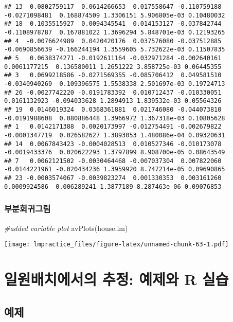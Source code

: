 \documentclass[
]{book}
\newenvironment{Shaded}{\begin{snugshade}}{\end{snugshade}}
\newcommand{\CommentTok}[1]{\textcolor[rgb]{0.56,0.35,0.01}{\textit{#1}}}
\newcommand{\FunctionTok}[1]{\textcolor[rgb]{0.00,0.00,0.00}{#1}}
\newcommand{\NormalTok}[1]{#1}
\begin{document}
\begin{verbatim}
## 13  0.0802759117  0.0614266653  0.017558647 -0.110759188 -0.0271098481  0.168874509 1.3306151 5.906805e-03 0.10480032
## 18  0.1035515927  0.0094345541  0.014153127 -0.037842744 -0.1108978787  0.167881022 1.3696294 5.848701e-03 0.12193265
## 4  -0.0076624989  0.0420420176  0.037576080 -0.037512885 -0.0690856639 -0.166244194 1.3559605 5.732622e-03 0.11507835
## 5   0.0638374271 -0.0192611164 -0.032971284 -0.002640161  0.0061177215  0.136580011 1.2651222 3.858725e-03 0.06445355
## 3   0.0699218586 -0.0271569355 -0.085706412  0.049581510 -0.0340940269  0.109396575 1.5538338 2.501697e-03 0.19724713
## 26 -0.0027742220 -0.0191783392  0.010712437 -0.010330051  0.0161132923 -0.094033628 1.2894913 1.839532e-03 0.05564326
## 19  0.0146019324  0.0368361881  0.021746080 -0.044073810 -0.0191988608  0.080886448 1.3966972 1.367318e-03 0.10805628
## 1   0.0142171388  0.0020173997 -0.012754491 -0.002679822 -0.0001347719  0.026582627 1.3893053 1.480086e-04 0.09320631
## 14  0.0067843423 -0.0004028513  0.010527346 -0.010173078 -0.0019433376  0.020622293 1.3797899 8.908700e-05 0.08643549
## 7   0.0062121502 -0.0030464468 -0.007037304  0.007822060 -0.0144221961 -0.020434236 1.3959920 8.747214e-05 0.09690865
## 23 -0.0003574067 -0.0039823274  0.001330353  0.003161260  0.0009924586  0.006289241 1.3877189 8.287463e-06 0.09076853
\end{verbatim}

\hypertarget{uxbd80uxbd84uxd68cuxadc0uxadf8uxb9bc-1}{%
\subsection{부분회귀그림}\label{uxbd80uxbd84uxd68cuxadc0uxadf8uxb9bc-1}}

\begin{Shaded}
\begin{Highlighting}[]
\CommentTok{\#added variable plot}
\FunctionTok{avPlots}\NormalTok{(house.lm)}
\end{Highlighting}
\end{Shaded}

\texttt{[image: lmpractice\_files/figure-latex/unnamed-chunk-63-1.pdf]}

\hypertarget{onewayanova}{%
\chapter{일원배치에서의 추정: 예제와 R 실습}\label{onewayanova}}

\hypertarget{uxc608uxc81c}{%
\section{예제}\label{uxc608uxc81c}}
\end{document}

